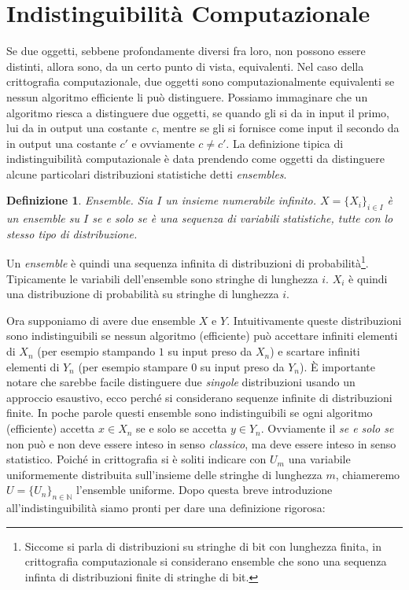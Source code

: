 \documentclass[a4paper,openright,twoside,12pt]{report}
\newtheorem{definizione}{Definizione}[chapter]
\begin{document}
\section{Indistinguibilit\`a Computazionale}
Se due oggetti, sebbene profondamente diversi fra loro, non possono essere distinti, allora sono, da un certo punto di vista, equivalenti.
Nel caso della crittografia computazionale, due oggetti sono computazionalmente equivalenti se nessun algoritmo efficiente li pu\`o distinguere.
Possiamo immaginare che un algoritmo riesca a distinguere due oggetti, se quando gli si da in input il primo, lui da in output una costante \emph{c}, mentre se gli si 
fornisce come input il secondo da in output una costante \emph{$c'$} e ovviamente $c \neq c'$.
La definizione tipica di indistinguibilit\`a computazionale \`e data prendendo come oggetti da distinguere alcune particolari distribuzioni statistiche detti \emph{ensembles}.

\begin{definizione}{Ensemble.}
Sia $I$ un insieme numerabile infinito. $X=\{X_i\}_{i \in I}$ \`e un ensemble su $I$ se e solo se \`e una sequenza di variabili statistiche, tutte con lo stesso tipo di distribuzione.
\end{definizione}
Un \emph{ensemble} \`e quindi una sequenza infinita di distribuzioni di probabilit\`a\footnote{Siccome si parla di distribuzioni su stringhe di bit con lunghezza finita,
in crittografia computazionale si considerano ensemble che sono una sequenza infinta di distribuzioni finite di stringhe di bit.}. 
Tipicamente le variabili dell'ensemble sono stringhe di lunghezza $i$. $X_i$ \`e quindi una distribuzione di probabilit\`a su stringhe di lunghezza $i$.

Ora supponiamo di avere due ensemble $X$ e $Y$. Intuitivamente queste distribuzioni sono indistinguibili se nessun algoritmo (efficiente) pu\`o accettare infiniti elementi di $X_n$
(per esempio stampando $1$ su input preso da $X_n$) e scartare infiniti elementi di $Y_n$ (per esempio stampare $0$ su input preso da $Y_n$). \`E importante notare che sarebbe facile 
distinguere due \emph{singole} distribuzioni usando un approccio esaustivo, ecco perch\'e si considerano sequenze infinite di distribuzioni finite.
In poche parole questi ensemble sono indistinguibili se ogni algoritmo (efficiente) accetta $x \in X_n$ se e solo se accetta $y \in Y_n$. Ovviamente il \emph{se e solo se} non pu\`o e non deve
essere inteso in senso \emph{classico}, ma deve essere inteso in senso statistico. Poich\'e in crittografia si \`e soliti indicare con $U_m$ una variabile
uniformemente distribuita sull'insieme delle stringhe di lunghezza $m$, chiameremo $U=\{U_n\}_{n \in \mathbb{N}}$ l'ensemble uniforme.
Dopo questa breve introduzione all'indistinguibilit\`a siamo pronti per dare una definizione rigorosa:
\end{document}

